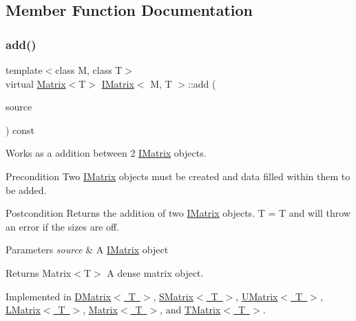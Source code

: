 \subsection{Member Function Documentation}
\mbox{\label{class_i_matrix_a661dc43bb607b98c28414cdd49bc64f7}} 
\subsubsection{\texorpdfstring{add()}{add()}}
{\footnotesize\ttfamily template$<$class M, class T$>$ \\
virtual \mbox{\hyperlink{class_matrix}{Matrix}}$<$T$>$ \mbox{\hyperlink{class_i_matrix}{I\+Matrix}}$<$ M, T $>$\+::add (\begin{DoxyParamCaption}\item[{const \mbox{\hyperlink{class_i_matrix}{I\+Matrix}}$<$ M, T $>$ \&}]{source }\end{DoxyParamCaption}) const\hspace{0.3cm}{\ttfamily [pure virtual]}}



Works as a addition between 2 \mbox{\hyperlink{class_i_matrix}{I\+Matrix}} objects. 

\begin{DoxyPrecond}{Precondition}
Two \mbox{\hyperlink{class_i_matrix}{I\+Matrix}} objects must be created and data filled within them to be added. 
\end{DoxyPrecond}
\begin{DoxyPostcond}{Postcondition}
Returns the addition of two \mbox{\hyperlink{class_i_matrix}{I\+Matrix}} objects. T = T and will throw an error if the sizes are off.
\end{DoxyPostcond}

\begin{DoxyParams}{Parameters}
{\em source} & A \mbox{\hyperlink{class_i_matrix}{I\+Matrix}} object \\
\hline
\end{DoxyParams}
\begin{DoxyReturn}{Returns}
Matrix$<$\+T$>$ A dense matrix object. 
\end{DoxyReturn}


Implemented in \mbox{\hyperlink{class_d_matrix_ab2ccdeb68a73333d16d6bdae272ca437}{D\+Matrix$<$ T $>$}}, \mbox{\hyperlink{class_s_matrix_afeb78de40327150348c31deb20ebcc6d}{S\+Matrix$<$ T $>$}}, \mbox{\hyperlink{class_u_matrix_ad8d5f4dc3945dbeec02c90db85266c39}{U\+Matrix$<$ T $>$}}, \mbox{\hyperlink{class_l_matrix_a18418777c3d498210d3a9c019583d0b9}{L\+Matrix$<$ T $>$}}, \mbox{\hyperlink{class_matrix_a19ee57616bae9c683f2c9e6756cba29e}{Matrix$<$ T $>$}}, and \mbox{\hyperlink{class_t_matrix_a244754d9ce3532e62cead25de6890533}{T\+Matrix$<$ T $>$}}.


